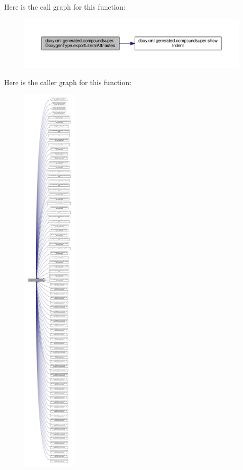 Here is the call graph for this function\+:
\nopagebreak
\begin{figure}[H]
\begin{center}
\leavevmode
\includegraphics[width=350pt]{d0/d54/classdoxyxml_1_1generated_1_1compoundsuper_1_1DoxygenType_ab293fde181efb4ae7ef1e647d68746af_cgraph}
\end{center}
\end{figure}




Here is the caller graph for this function\+:
\nopagebreak
\begin{figure}[H]
\begin{center}
\leavevmode
\includegraphics[height=550pt]{d0/d54/classdoxyxml_1_1generated_1_1compoundsuper_1_1DoxygenType_ab293fde181efb4ae7ef1e647d68746af_icgraph}
\end{center}
\end{figure}


